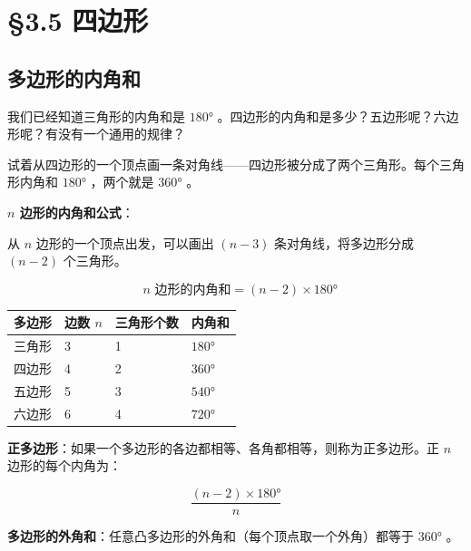 \chapter{§3.5 四边形}
\label{sec:3.5}





\section*{多边形的内角和}


\begin{explore}


我们已经知道三角形的内角和是 $180°$ 。四边形的内角和是多少？五边形呢？六边形呢？有没有一个通用的规律？

试着从四边形的一个顶点画一条对角线——四边形被分成了两个三角形。每个三角形内角和 $180°$ ，两个就是 $360°$ 。

\end{explore}

\begin{understand}


\textbf{ $n$ 边形的内角和公式}：

从 $n$ 边形的一个顶点出发，可以画出 $(n - 3)$ 条对角线，将多边形分成 $(n - 2)$ 个三角形。

\[
\text{ $n$ 边形的内角和} = (n - 2) \times 180°
\]


\begin{center}
\begin{tabular}{llll}
\toprule
多边形 & 边数 $n$ & 三角形个数 & 内角和 \\
\midrule
三角形 & 3 & 1 & $180°$ \\
四边形 & 4 & 2 & $360°$ \\
五边形 & 5 & 3 & $540°$ \\
六边形 & 6 & 4 & $720°$ \\
\bottomrule
\end{tabular}
\end{center}


\textbf{正多边形}：如果一个多边形的各边都相等、各角都相等，则称为正多边形。正 $n$ 边形的每个内角为：

\[
\frac{(n - 2) \times 180°}{n}
\]


\textbf{多边形的外角和}：任意凸多边形的外角和（每个顶点取一个外角）都等于 $360°$ 。

\end{understand}

